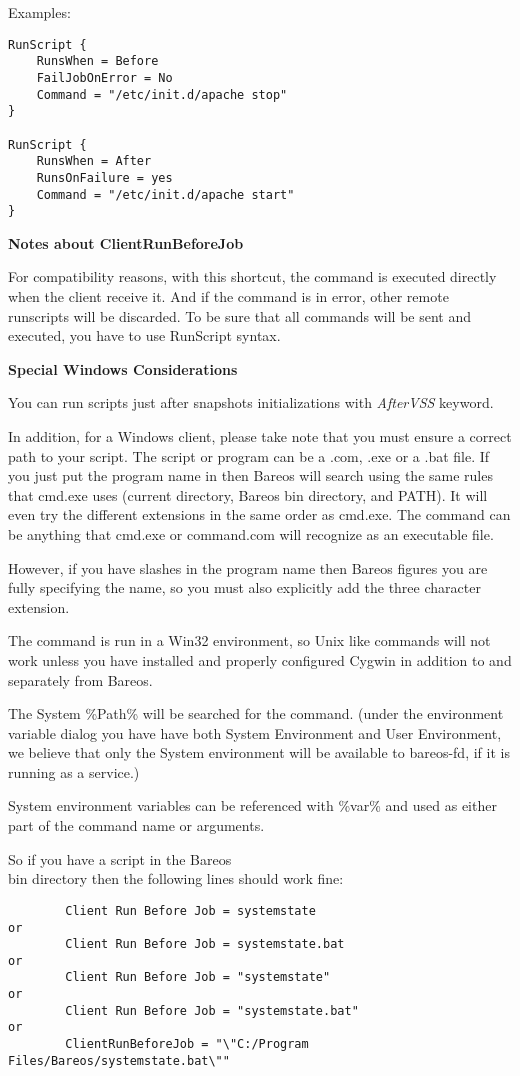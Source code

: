 \begin{description}
Examples:
\begin{verbatim}
RunScript {
    RunsWhen = Before
    FailJobOnError = No
    Command = "/etc/init.d/apache stop"
}

RunScript {
    RunsWhen = After
    RunsOnFailure = yes
    Command = "/etc/init.d/apache start"
}
\end{verbatim}

{\bf Notes about ClientRunBeforeJob}

For compatibility reasons, with this shortcut, the command is executed
directly when the client receive it. And if the command is in error, other
remote runscripts will be discarded. To be sure that all commands will be
sent and executed, you have to use RunScript syntax.

{\bf Special Windows Considerations}

You can run scripts just after snapshots initializations with
\textsl{AfterVSS} keyword.

In addition, for a Windows client, please take
note that you must ensure a correct path to your script.  The script or
program can be a .com, .exe or a .bat file.  If you just put the program
name in then Bareos will search using the same rules that cmd.exe uses
(current directory, Bareos bin directory, and PATH).  It will even try the
different extensions in the same order as cmd.exe.
The command can be anything that cmd.exe or command.com will recognize
as an executable file.

However, if you have slashes in the program name then Bareos figures you
are fully specifying the name, so you must also explicitly add the three
character extension.

The command is run in a Win32 environment, so Unix like commands will not
work unless you have installed and properly configured Cygwin in addition
to and separately from Bareos.

The System \%Path\% will be searched for the command.  (under the
environment variable dialog you have have both System Environment and
User Environment, we believe that only the System environment will be
available to bareos-fd, if it is running as a service.)

System environment variables can be referenced with \%var\% and
used as either part of the command name or arguments.

So if you have a script in the Bareos\\bin directory then the following lines
should work fine:

\footnotesize
\begin{verbatim}
        Client Run Before Job = systemstate
or
        Client Run Before Job = systemstate.bat
or
        Client Run Before Job = "systemstate"
or
        Client Run Before Job = "systemstate.bat"
or
        ClientRunBeforeJob = "\"C:/Program Files/Bareos/systemstate.bat\""
\end{verbatim}
\normalsize


\end{description}
